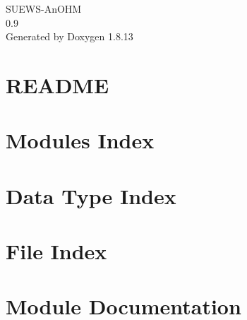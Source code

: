 \documentclass[twoside]{book}
\newcommand{\+}{\discretionary{\mbox{\scriptsize$\hookleftarrow$}}{}{}}
\newcommand{\clearemptydoublepage}{%
  \newpage{\pagestyle{empty}\cleardoublepage}%
}
\begin{document}
\hypersetup{pageanchor=false,
             bookmarksnumbered=true,
             pdfencoding=unicode
            }
\begin{titlepage}
\vspace*{7cm}
\begin{center}%
{\Large S\+U\+E\+W\+S-\/\+An\+O\+HM \\[1ex]\large 0.\+9 }\\
\vspace*{1cm}
{\large Generated by Doxygen 1.8.13}\\
\end{center}
\end{titlepage}
\clearemptydoublepage
{}
\tableofcontents
\clearemptydoublepage
{}
\hypersetup{pageanchor=true}

\chapter{R\+E\+A\+D\+ME}
\label{md__r_e_a_d_m_e}

\chapter{Modules Index}

\chapter{Data Type Index}

\chapter{File Index}

\chapter{Module Documentation}








































\end{document}
